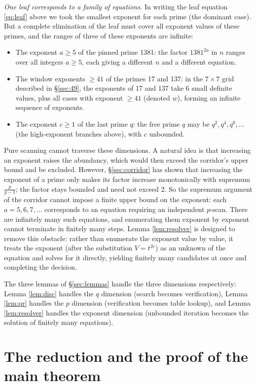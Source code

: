 \documentclass[11pt]{article}
\theoremstyle{remark}
\begin{document}
\emph{One leaf corresponds to a family of equations.} In writing the leaf equation \eqref{eq:leaf} above we took the smallest exponent for each prime (the dominant case). But a complete elimination of the leaf must cover all exponent values of these primes, and the ranges of three of these exponents are infinite:
\begin{itemize}
\item The exponent $a \ge 5$ of the pinned prime 1381: the factor $1381^{2a}$ in $n$ ranges over all integers $a \ge 5$, each giving a different $n$ and a different equation.
\item The window exponents $\ge 41$ of the primes 17 and 137: in the $7 \times 7$ grid described in \S\ref{sec:49}, the exponents of 17 and 137 take 6 small definite values, plus all cases with exponent $\ge 41$ (denoted $w$), forming an infinite sequence of exponents.
\item The exponent $c \ge 1$ of the last prime $q$: the free prime $q$ may be $q^2, q^4, q^6, \dots$ (the high-exponent branches above), with $c$ unbounded.
\end{itemize} Pure scanning cannot traverse these dimensions. A natural idea is that increasing an exponent raises the abundancy, which would then exceed the corridor's upper bound and be excluded. However, \S\ref{sec:corridor} has shown that increasing the exponent of a prime only makes its factor increase monotonically with supremum $\frac{p}{p-1}$; the factor stays bounded and need not exceed 2. So the supremum argument of the corridor cannot impose a finite upper bound on the exponent: each $a = 5, 6, 7, \dots$ corresponds to an equation requiring an independent $p$-scan. There are infinitely many such equations, and enumerating them exponent by exponent cannot terminate in finitely many steps. Lemma \ref{lem:resolver} is designed to remove this obstacle: rather than enumerate the exponent value by value, it treats the exponent (after the substitution $V = t^{2e}$) as an unknown of the equation and solves for it directly, yielding finitely many candidates at once and completing the decision.

The three lemmas of \S\ref{sec:lemmas} handle the three dimensions respectively: Lemma \ref{lem:disc} handles the $q$ dimension (search becomes verification), Lemma \ref{lem:qr} handles the $p$ dimension (verification becomes table lookup), and Lemma \ref{lem:resolver} handles the exponent dimension (unbounded iteration becomes the solution of finitely many equations).

\section{The reduction and the proof of the main theorem}\label{sec:reduction}
\end{document}
